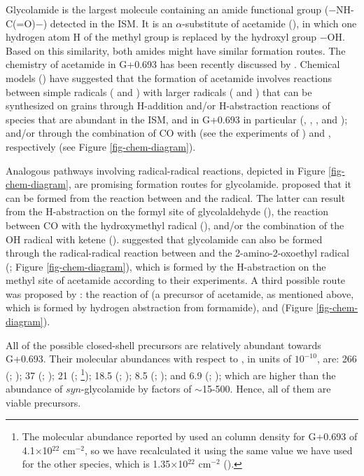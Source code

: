 \documentclass[twocolumn]{aastex63}
\begin{document}
Glycolamide is the largest molecule containing an amide functional group ($-$NH-C(=O)$-$) detected in the ISM. It is an $\alpha$-substitute of acetamide (), in which one hydrogen atom H of the methyl group is replaced by the hydroxyl group $-$OH. Based on this similarity, both amides might have similar formation routes. The chemistry of acetamide in G+0.693 has been recently discussed by \citet{zeng2023}. Chemical models (\citealt{belloche2017,belloche2019,garrod2022}) have suggested that the formation of acetamide involves reactions between simple radicals ( and ) with larger radicals ( and ) that can be synthesized on grains through H-addition and/or H-abstraction reactions of species that are abundant in the ISM, and in G+0.693 in particular (, , , and ); and/or through the combination of CO with  (see the experiments of \citealt{ligterink2018}) and , respectively (see Figure \ref{fig-chem-diagram}).

Analogous pathways involving radical-radical reactions, depicted in Figure \ref{fig-chem-diagram}, are promising formation routes for glycolamide. \citet{sanz-novo2020} proposed that it can be formed from the reaction between  and the  radical. The latter can result from the H-abstraction on the formyl site of glycolaldehyde (), the reaction between CO with the hydroxymethyl radical (), and/or the combination of the OH radical with ketene ().
\citet{haupa2020} suggested that glycolamide can also be formed through the radical-radical reaction between  and the 2-amino-2-oxoethyl radical (; Figure \ref{fig-chem-diagram}), which is formed by the H-abstraction on the methyl site of acetamide according to their experiments.
A third possible route was proposed by \citet{garrod_complex_2008}: the reaction of  (a precursor of acetamide, as mentioned above, which is formed by hydrogen
abstraction from formamide), and  (Figure \ref{fig-chem-diagram}). 
 
All of the possible closed-shell precursors are relatively abundant towards G+0.693. Their molecular abundances with respect to , in units of $10^{-10}$, are: 266 (; \citealt{zeng2018}); 37 (; \citealt{Sanz-Novo2022}); 21 (; \citealt{requena-torres_largest_2008}\footnote{The molecular abundance reported by \citet{requena-torres_largest_2008} used an  column density for G+0.693 of 4.1$\times$10$^{22}$ cm$^{-2}$, so we have recalculated it using the same value we have used for the other species, which is 1.35$\times$10$^{22}$ cm$^{-2}$ (\citealt{martin_tracing_2008}).}); 18.5 (; \citealt{zeng2023}); 8.5 (; \citealt{zeng2023}); and 6.9 (; \citealt{rivilla2022a}); which are higher than the abundance of $syn$-glycolamide by factors of $\sim$15-500. Hence, all of them are viable precursors. 
\end{document}
